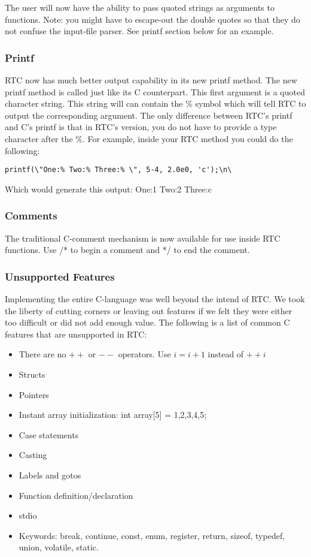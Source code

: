 The user will now have the ability to pass quoted strings as arguments to 
functions. Note: you might have to escape-out the double quotes so that they
do not confuse the input-file parser. See printf section below for an example.

\subsubsection{Printf}

RTC now has much better output capability in its new printf method. The
new printf method is called just like its C counterpart. This first argument
is a quoted character string. This string will can contain the \% symbol 
which will tell RTC to output the corresponding argument. The only difference
between RTC's printf and C's printf is that in RTC's version, you do not have
to provide a type character after the \%. For example, inside your RTC method
you could do the following:

{\ttfamily \begin{verbatim}
printf(\"One:% Two:% Three:% \", 5-4, 2.0e0, 'c');\n\
\end{verbatim} }

\noindent
Which would generate this output: One:1 Two:2 Three:c

\subsubsection{Comments}

The traditional C-comment mechanism is now available for use inside RTC
functions. Use /* to begin a comment and */ to end the comment.

\subsubsection{Unsupported Features}

Implementing the entire C-language was well beyond the intend of RTC. We took
the liberty of cutting corners or leaving out features if we felt they were 
either too difficult or did not add enough value. The following is a list
of common C features that are unsupported in RTC:
\begin{itemize}
  \item There are no $++$ or $--$ operators. Use $i = i + 1$ instead of $++i$
  \item Structs
  \item Pointers
  \item Instant array initialization: int array[5] = {1,2,3,4,5};
  \item Case statements
  \item Casting
  \item Labels and gotos
  \item Function definition/declaration
  \item stdio
  \item Keywords: break, continue, const, enum, register, return, sizeof,
    typedef, union, volatile, static.
\end{itemize} 

